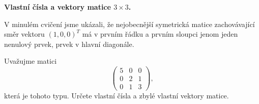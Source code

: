 \documentclass{article}
\let\oldtextbf\textbf
\def\textbf#1{%
  \oldtextbf{\color{red} #1}}
\begin{document}
\newpage
\textbf{Vlastní čísla a vektory matice $3\times 3$.}

V minulém cvičení jsme ukázali, že nejobecnější symetrická matice zachovávající směr vektoru  $(1,0,0)^T$ má v prvním řádku a prvním sloupci jenom jeden nenulový prvek, prvek v hlavní diagonále.

Uvažujme matici
\begin{equation*}
  \begin{pmatrix}
  5 & 0 & 0\\
  0 & 2 & 1\\
  0 & 1 & 3
\end{pmatrix},
\end{equation*}
která je tohoto typu.
Určete vlastní čísla a zbylé vlastní vektory matice.
\end{document}
